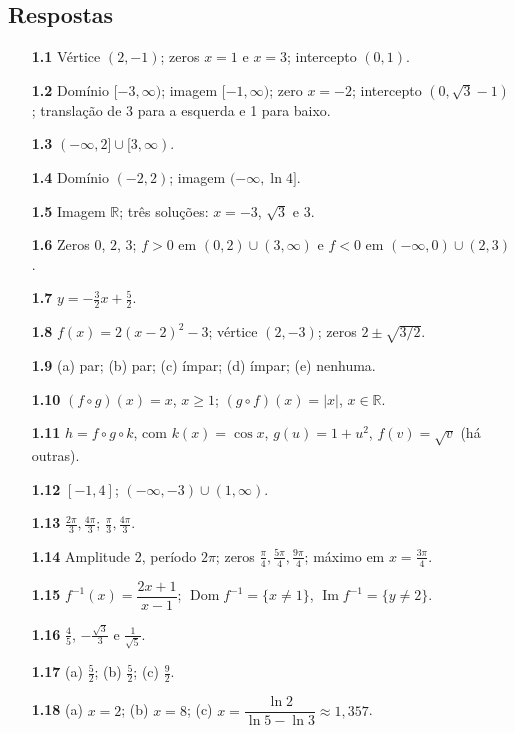 \subsection*{Respostas}
{\small\begin{multicols}{2}\raggedright
\begin{itemize}[leftmargin=2.7em,labelsep=0.5em,itemsep=1pt]
\item[\textbf{1.1}] Vértice $(2,-1)$; zeros $x=1$ e $x=3$; intercepto $(0,1)$.
\item[\textbf{1.2}] Domínio $[-3,\infty)$; imagem $[-1,\infty)$; zero $x=-2$; intercepto $(0,\sqrt3-1)$; translação de 3 para a esquerda e 1 para baixo.
\item[\textbf{1.3}] $(-\infty,2]\cup[3,\infty)$.
\item[\textbf{1.4}] Domínio $(-2,2)$; imagem $(-\infty,\ln4]$.
\item[\textbf{1.5}] Imagem $\mathbb R$; três soluções: $x=-3$, $\sqrt3$ e $3$.
\item[\textbf{1.6}] Zeros $0$, $2$, $3$; $f>0$ em $(0,2)\cup(3,\infty)$ e $f<0$ em $(-\infty,0)\cup(2,3)$.
\item[\textbf{1.7}] $y=-\tfrac32x+\tfrac52$.
\item[\textbf{1.8}] $f(x)=2(x-2)^2-3$; vértice $(2,-3)$; zeros $2\pm\sqrt{3/2}$.
\item[\textbf{1.9}] (a) par; (b) par; (c) ímpar; (d) ímpar; (e) nenhuma.
\item[\textbf{1.10}] $(f\circ g)(x)=x$, $x\ge1$; $(g\circ f)(x)=|x|$, $x\in\mathbb R$.
\item[\textbf{1.11}] $h=f\circ g\circ k$, com $k(x)=\cos x$, $g(u)=1+u^2$, $f(v)=\sqrt v$ (há outras).
\item[\textbf{1.12}] $[-1,4]$; $(-\infty,-3)\cup(1,\infty)$.
\item[\textbf{1.13}] $\tfrac{2\pi}3,\tfrac{4\pi}3$; $\tfrac\pi3,\tfrac{4\pi}3$.
\item[\textbf{1.14}] Amplitude 2, período $2\pi$; zeros $\tfrac\pi4,\tfrac{5\pi}4,\tfrac{9\pi}4$; máximo em $x=\tfrac{3\pi}4$.
\item[\textbf{1.15}] $f^{-1}(x)=\dfrac{2x+1}{x-1}$; $\operatorname{Dom}f^{-1}=\{x\neq1\}$, $\operatorname{Im}f^{-1}=\{y\neq2\}$.
\item[\textbf{1.16}] $\tfrac45$, $-\tfrac{\sqrt3}3$ e $\tfrac1{\sqrt5}$.
\item[\textbf{1.17}] (a) $\tfrac52$; (b) $\tfrac52$; (c) $\tfrac92$.
\item[\textbf{1.18}] (a) $x=2$; (b) $x=8$; (c) $x=\dfrac{\ln2}{\ln5-\ln3}\approx1{,}357$.

\end{itemize}
\end{multicols}}
